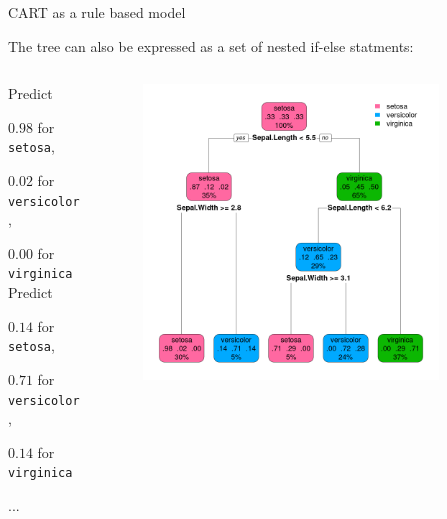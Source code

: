 \documentclass[11pt,compress,t,notes=noshow, xcolor=table]{beamer}
\begin{document}
\begin{vbframe}{CART as a rule based model}

The tree can also be expressed as a set of nested if-else statments:

\begin{columns}
\begin{column}{0.5\textwidth}
\begin{algorithmic}
     \State Predict 
     
     $0.98$ for \texttt{setosa}, 
     
     $0.02$ for \texttt{versicolor}, 
     
     $0.00$ for \texttt{virginica}
    \Else
      \State Predict 
      
      $0.14$ for \texttt{setosa}, 
      
      $0.71$ for \texttt{versicolor},
      
      $0.14$ for \texttt{virginica}
      
    \EndIf
  \Else
     \State ...
  \EndIf
\end{algorithmic}
\end{column}
\begin{column}{0.5\textwidth}
\begin{figure}
 \includegraphics[width=0.9\textwidth, keepaspectratio]{figure_man/tree_depth3_structure.png}
\end{figure}
\end{column}
\end{columns}


\end{vbframe}
\end{document}
